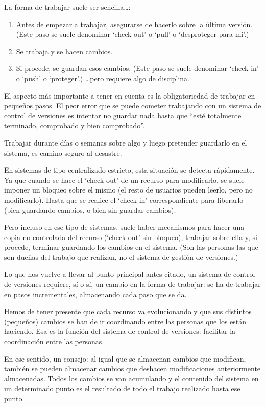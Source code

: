 \documentclass[spanish,12pt,a4paper,final,oneside]{book}
\begin{document}
La forma de trabajar suele ser sencilla\ldots:
\begin{enumerate}
\item Antes de empezar a trabajar, asegurarse de hacerlo sobre la última versión. (Este paso se suele denominar ‘check-out’ o ‘pull’ o ‘desproteger para mi’.)
\item Se trabaja y se hacen cambios. 
\item Si procede, se guardan esos cambios. (Este paso se suele denominar ‘check-in’ o ‘push’ o ‘proteger’.)
\ldots pero requiere algo de disciplina.
\end{enumerate}

El aspecto más importante a tener en cuenta es la obligatoriedad de trabajar en pequeños pasos. El peor error que se puede cometer trabajando con un sistema de control de versiones es intentar no guardar nada hasta que ``esté totalmente terminado, comprobado y bien comprobado''. 

Trabajar durante días o semanas sobre algo y luego pretender guardarlo en el sistema, es camino seguro al desastre.

En sistemas de tipo centralizado estricto, esta situación se detecta rápidamente. Ya que cuando se hace el ‘check-out’ de un recurso para modificarlo, se suele imponer un bloqueo sobre el mismo (el resto de usuarios pueden leerlo, pero no modificarlo). Hasta que se realice el ‘check-in’ correspondiente para liberarlo (bien guardando cambios, o bien sin guardar cambios). 

Pero incluso en ese tipo de sistemas, suele haber mecanismos para hacer una copia no controlada del recurso (‘check-out’ sin bloqueo), trabajar sobre ella y, si procede, terminar guardando los cambios en el sistema. (Son las personas las que son dueñas del trabajo que realizan, no el sistema de gestión de versiones.)

Lo que nos vuelve a llevar al punto principal antes citado, un sistema de control de versiones requiere, sí o sí, un cambio en la forma de trabajar: se ha de trabajar en pasos incrementales, almacenando cada paso que se da. 

Hemos de tener presente que cada recurso va evolucionando y que sus distintos (pequeños) cambios se han de ir coordinando entre las personas que los están haciendo. Esa es la función del sistema de control de versiones: facilitar la coordinación entre las personas.

En ese sentido, un consejo: al igual que se almacenan cambios que modifican, también se pueden almacenar cambios que deshacen modificaciones anteriormente almacenadas. Todos los cambios se van acumulando y el contenido del sistema en un determinado punto es el resultado de todo el trabajo realizado hasta ese punto.
 
\end{document}
